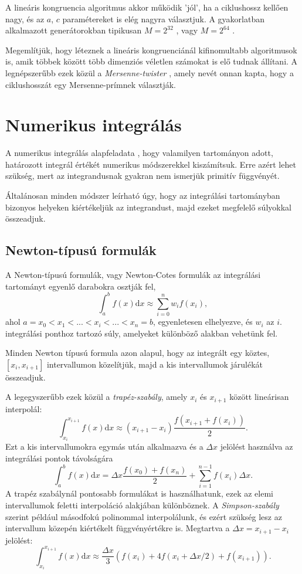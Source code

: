 \documentclass[12pt]{article}
\theoremstyle{plain}
\begin{document}
A lineáris kongruencia algoritmus akkor működik 'jól', ha a ciklushossz kellően nagy, és az $a$, $c$ paramétereket is elég nagyra választjuk. A gyakorlatban alkalmazott generátorokban tipikusan $M=2^{32}$ \cite{numrecipes}, vagy $M=2^{64}$ \cite{knuth}. 

Megemlítjük, hogy léteznek a lineáris kongruenciánál kifinomultabb algoritmusok is, amik többek között több dimenziós véletlen számokat is elő tudnak állítani. A legnépszerűbb ezek közül a {\em Mersenne-twister} \cite{random}, amely nevét onnan kapta, hogy a ciklushosszát egy Mersenne-prímnek választják.  
\section{Numerikus integrálás}
A numerikus integrálás alapfeladata \cite{landau}, hogy valamilyen tartományon adott, határozott integrál értékét numerikus módszerekkel kiszámítsuk. Erre azért lehet szükség, mert az integrandusnak gyakran nem ismerjük primitív függvényét. 

Általánosan minden módszer leírható úgy, hogy az integrálási tartományban bizonyos helyeken kiértékeljük az integrandust, majd ezeket megfelelő súlyokkal összeadjuk. 
\subsection{Newton-típusú formulák}
A Newton-típusú formulák, vagy Newton-Cotes formulák az integrálási tartományt egyenlő darabokra osztják fel,
\begin{equation}
    \label{nc}
    \int_a^b f(x) \text{d}x  \approx \sum_{i=0}^n w_i f(x_i),
\end{equation}
ahol $a = x_0 < x_1 < ... < x_i < ... < x_n=b$, egyenletesen elhelyezve, és $w_i$ az $i$. integrálási ponthoz tartozó súly, amelyeket különböző alakban vehetünk fel. 

Minden Newton típusú formula azon alapul, hogy az integrált egy köztes, $[x_i, x_{i+1}]$ intervallumon közelítjük, majd a kis intervallumok járulékát összeadjuk. 

A legegyszerűbb ezek közül a {\em trapéz-szabály}, amely $x_i$ és $x_{i+1}$ között lineárisan interpolál:
\begin{equation}
    \label{trap}
    \int_{x_{i}}^{x_{i+1}} f(x) \text{d}x \approx (x_{i+1} - x_i) \frac{f(x_{i+1} + f(x_i))}{2}.
\end{equation}
Ezt a kis intervallumokra egymás után alkalmazva és a $\Delta x$ jelölést használva az integrálási pontok távolságára
\begin{equation}
    \int_a^b f(x) \text{d}x  = \Delta x  \frac{f(x_0) + f(x_n)}{2} + \sum_{i = 1} ^{n-1}f(x_i)\Delta x.
\end{equation}
A trapéz szabálynál pontosabb formulákat is használhatunk, ezek az elemi intervallumok feletti interpoláció alakjában különböznek. 
A {\em Simpson-szabály} szerint például másodfokú polinommal interpolálunk, és ezért szükség lesz az intervallum közepén kiértékelt függvényértékre is. Megtartva a $\Delta x = x_{i+1} - x_i$ jelölést:
\begin{equation}
    \int_{x_{i}}^{x_{i+1}} f(x) \text{d}x \approx \frac{\Delta x}{3}\left( f(x_i) + 4f(x_i+\Delta x/2) + f(x_{i+1})\right).
\end{equation}
\end{document}
